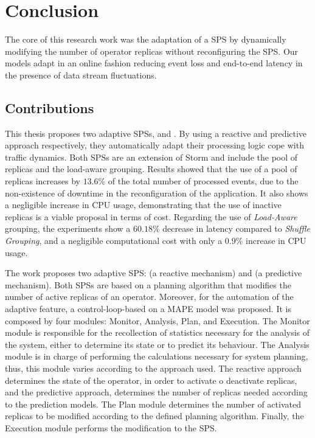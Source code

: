 \chapter{Conclusion}
\label{conclusion}
The core of this research work was the adaptation of a SPS by dynamically modifying the number of operator replicas without reconfiguring the SPS. Our models adapt in an online fashion reducing event loss and end-to-end latency in the presence of data stream fluctuations.

\section{Contributions}

This thesis proposes two adaptive SPSs, \rSPS{} and \pSPS{}. By using a reactive and predictive approach respectively, they automatically adapt their processing logic cope with traffic dynamics. Both SPSs are an extension of Storm and include the pool of replicas and the load-aware grouping. Results showed that the use of a pool of replicas increases by $13.6\%$ of the total number of processed events, due to the non-existence of downtime in the reconfiguration of the application. It also shows a negligible increase in CPU usage, demonstrating
that the use of inactive replicas is a viable proposal in terms of cost. Regarding the use of \textit{Load-Aware} grouping, the experiments show a $60.18\%$ decrease in latency
compared to \textit{Shuffle Grouping}, and a negligible computational cost with only a $0.9\%$ increase in CPU usage.

The work proposes two adaptive SPS: \rSPS{} (a reactive mechanism) and \pSPS{} (a predictive mechanism). Both SPSs are based on a planning algorithm that modifies the number of active replicas of an operator. Moreover, for the automation of the adaptive feature, a control-loop-based on a MAPE model was proposed. It is composed by four modules: Monitor, Analysis, Plan, and Execution. The Monitor module is responsible for the recollection of statistics necessary for the analysis of the system, either to determine its state or to predict its behaviour. The Analysis module is in charge of performing the calculations necessary for system planning, thus, this module varies according to the approach used. The reactive approach determines the state of the operator, in order to activate o deactivate replicas, and the predictive approach, determines the number of replicas needed according to the prediction models. The Plan module determines the number of activated replicas to be modified according to the defined planning algorithm. Finally, the Execution module performs the modification to the SPS.

